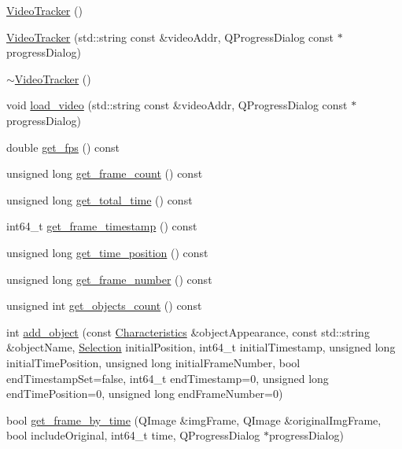 \begin{DoxyCompactItemize}
\item 
\hyperlink{classVideoTracker_a8a4eb43cf75ecaec34b1b54b99d7e701}{Video\+Tracker} ()
\item 
\hyperlink{classVideoTracker_a83a8ecb8fe646a44aaa1c892e9a69a65}{Video\+Tracker} (std\+::string const \&video\+Addr, Q\+Progress\+Dialog const $\ast$progress\+Dialog)
\item 
\hyperlink{classVideoTracker_ac20788504b98efbae977d3d55459b443}{$\sim$\+Video\+Tracker} ()
\item 
void \hyperlink{classVideoTracker_aef0c8e2fbeaaac3fcd1737c457a4c0ea}{load\+\_\+video} (std\+::string const \&video\+Addr, Q\+Progress\+Dialog const $\ast$progress\+Dialog)
\item 
double \hyperlink{classVideoTracker_a2e429fbc7d3f7c4904bcfab51c8aae25}{get\+\_\+fps} () const 
\item 
unsigned long \hyperlink{classVideoTracker_af5ef823d494e6fdc75b4aedbd8739ba5}{get\+\_\+frame\+\_\+count} () const 
\item 
unsigned long \hyperlink{classVideoTracker_ac442e8d7148366c07b71ec4fc0505e5b}{get\+\_\+total\+\_\+time} () const 
\item 
int64\+\_\+t \hyperlink{classVideoTracker_ac9a2a134bbc59f24defb0d8920e1d79c}{get\+\_\+frame\+\_\+timestamp} () const 
\item 
unsigned long \hyperlink{classVideoTracker_a21c40e168f99bf04abfb071406b060b5}{get\+\_\+time\+\_\+position} () const 
\item 
unsigned long \hyperlink{classVideoTracker_afa5bf7dc2a1a5b90d762ff310dfc89b8}{get\+\_\+frame\+\_\+number} () const 
\item 
unsigned int \hyperlink{classVideoTracker_ab8d3f48ad0615b992ac0f767f206d2af}{get\+\_\+objects\+\_\+count} () const 
\item 
int \hyperlink{classVideoTracker_ac5078e2bfb902a7b24d76bcd570bc8f2}{add\+\_\+object} (const \hyperlink{structCharacteristics}{Characteristics} \&object\+Appearance, const std\+::string \&object\+Name, \hyperlink{structSelection}{Selection} initial\+Position, int64\+\_\+t initial\+Timestamp, unsigned long initial\+Time\+Position, unsigned long initial\+Frame\+Number, bool end\+Timestamp\+Set=false, int64\+\_\+t end\+Timestamp=0, unsigned long end\+Time\+Position=0, unsigned long end\+Frame\+Number=0)
\item 
bool \hyperlink{classVideoTracker_a3edec586640511e2a3e58605cfb7545d}{get\+\_\+frame\+\_\+by\+\_\+time} (Q\+Image \&img\+Frame, Q\+Image \&original\+Img\+Frame, bool include\+Original, int64\+\_\+t time, Q\+Progress\+Dialog $\ast$progress\+Dialog)

\end{DoxyCompactItemize}
